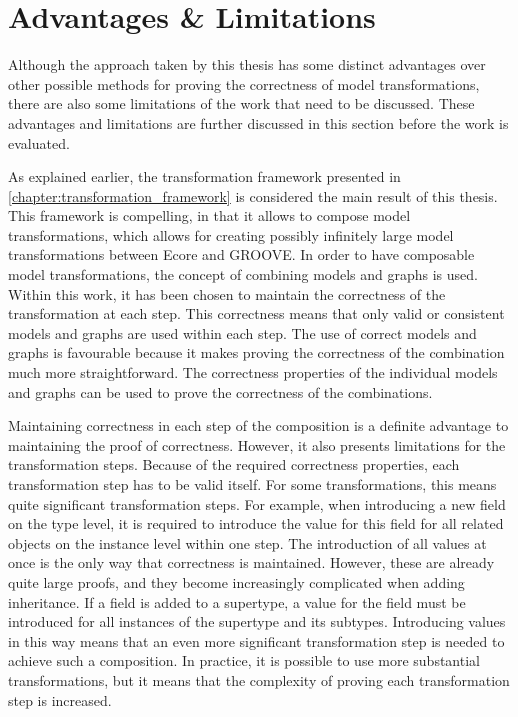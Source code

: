 \section{Advantages \& Limitations}
\label{sec:conclusion:advantages_and_limitations}

Although the approach taken by this thesis has some distinct advantages over other possible methods for proving the correctness of model transformations, there are also some limitations of the work that need to be discussed. These advantages and limitations are further discussed in this section before the work is evaluated.

As explained earlier, the transformation framework presented in \cref{chapter:transformation_framework} is considered the main result of this thesis. This framework is compelling, in that it allows to compose model transformations, which allows for creating possibly infinitely large model transformations between Ecore and GROOVE. In order to have composable model transformations, the concept of combining models and graphs is used. Within this work, it has been chosen to maintain the correctness of the transformation at each step. This correctness means that only valid or consistent models and graphs are used within each step. The use of correct models and graphs is favourable because it makes proving the correctness of the combination much more straightforward. The correctness properties of the individual models and graphs can be used to prove the correctness of the combinations.

Maintaining correctness in each step of the composition is a definite advantage to maintaining the proof of correctness. However, it also presents limitations for the transformation steps. Because of the required correctness properties, each transformation step has to be valid itself. For some transformations, this means quite significant transformation steps. For example, when introducing a new field on the type level, it is required to introduce the value for this field for all related objects on the instance level within one step. The introduction of all values at once is the only way that correctness is maintained. However, these are already quite large proofs, and they become increasingly complicated when adding inheritance. If a field is added to a supertype, a value for the field must be introduced for all instances of the supertype and its subtypes. Introducing values in this way means that an even more significant transformation step is needed to achieve such a composition. In practice, it is possible to use more substantial transformations, but it means that the complexity of proving each transformation step is increased.

